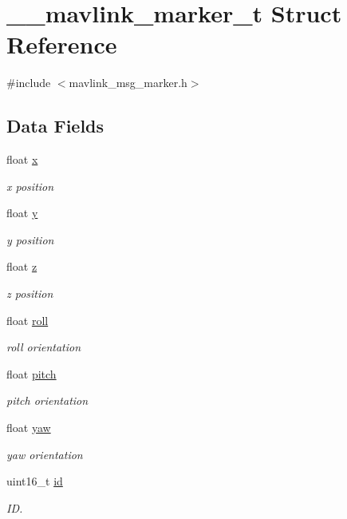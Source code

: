 \hypertarget{struct____mavlink__marker__t}{\section{\+\_\+\+\_\+mavlink\+\_\+marker\+\_\+t Struct Reference}
\label{struct____mavlink__marker__t}
}


{\ttfamily \#include $<$mavlink\+\_\+msg\+\_\+marker.\+h$>$}

\subsection*{Data Fields}
\begin{DoxyCompactItemize}
\item 
float \hyperlink{struct____mavlink__marker__t_a31a7e83717fee9c5010abfdcaefe676d}{x}
\begin{DoxyCompactList}\small\item\em x position \end{DoxyCompactList}\item 
float \hyperlink{struct____mavlink__marker__t_a6a8f15a2d48ffd78446f95c0d813b524}{y}
\begin{DoxyCompactList}\small\item\em y position \end{DoxyCompactList}\item 
float \hyperlink{struct____mavlink__marker__t_a386320a826f2c5dc875e4d9102e914ca}{z}
\begin{DoxyCompactList}\small\item\em z position \end{DoxyCompactList}\item 
float \hyperlink{struct____mavlink__marker__t_a83b50e31d93a8078a07481ba7cbee5f3}{roll}
\begin{DoxyCompactList}\small\item\em roll orientation \end{DoxyCompactList}\item 
float \hyperlink{struct____mavlink__marker__t_a6001da416b7160647e751478b47ecefd}{pitch}
\begin{DoxyCompactList}\small\item\em pitch orientation \end{DoxyCompactList}\item 
float \hyperlink{struct____mavlink__marker__t_ac61ec0e56487b433a66cf489a618d8c0}{yaw}
\begin{DoxyCompactList}\small\item\em yaw orientation \end{DoxyCompactList}\item 
uint16\+\_\+t \hyperlink{struct____mavlink__marker__t_ab0bc0483b9837a8e1c28c2badb3342ee}{id}
\begin{DoxyCompactList}\small\item\em I\+D. \end{DoxyCompactList}\end{DoxyCompactItemize}


